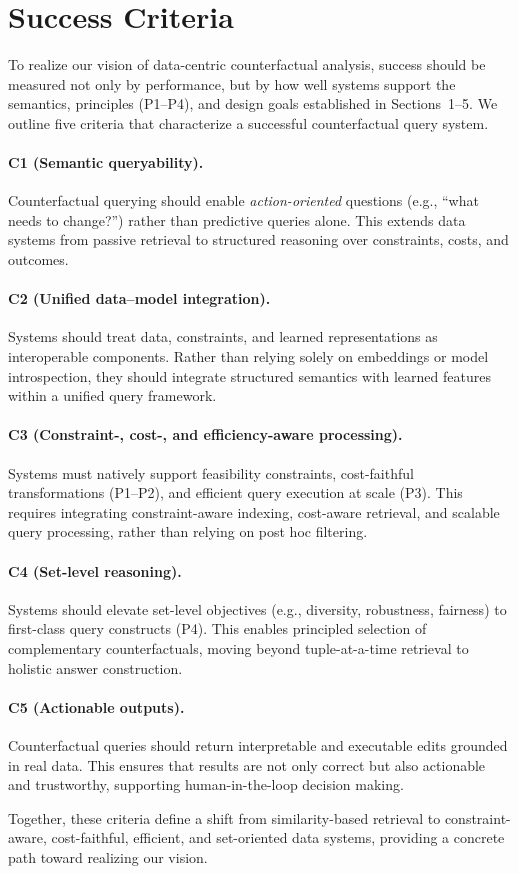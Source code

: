 \section{Success Criteria}\label{sec:success}

To realize our vision of data-centric counterfactual analysis, success should be measured not only by performance, but by how well systems support the semantics, principles (P1--P4), and design goals established in Sections~1--5. We outline five criteria that characterize a successful counterfactual query system.

\paragraph{\textbf{C1 (Semantic queryability).}}
Counterfactual querying should enable \emph{action-oriented} questions (e.g., ``what needs to change?'') rather than predictive queries alone. This extends data systems from passive retrieval to structured reasoning over constraints, costs, and outcomes.

\paragraph{\textbf{C2 (Unified data--model integration).}}
Systems should treat data, constraints, and learned representations as interoperable components. Rather than relying solely on embeddings or model introspection, they should integrate structured semantics with learned features within a unified query framework.

\paragraph{\textbf{C3 (Constraint-, cost-, and efficiency-aware processing).}}
Systems must natively support feasibility constraints, cost-faithful transformations (P1--P2), and efficient query execution at scale (P3). This requires integrating constraint-aware indexing, cost-aware retrieval, and scalable query processing, rather than relying on post hoc filtering.

\paragraph{\textbf{C4 (Set-level reasoning).}}
Systems should elevate set-level objectives (e.g., diversity, robustness, fairness) to first-class query constructs (P4). This enables principled selection of complementary counterfactuals, moving beyond tuple-at-a-time retrieval to holistic answer construction.

\paragraph{\textbf{C5 (Actionable outputs).}}
Counterfactual queries should return interpretable and executable edits grounded in real data. This ensures that results are not only correct but also actionable and trustworthy, supporting human-in-the-loop decision making.

Together, these criteria define a shift from similarity-based retrieval to constraint-aware, cost-faithful, efficient, and set-oriented data systems, providing a concrete path toward realizing our vision.